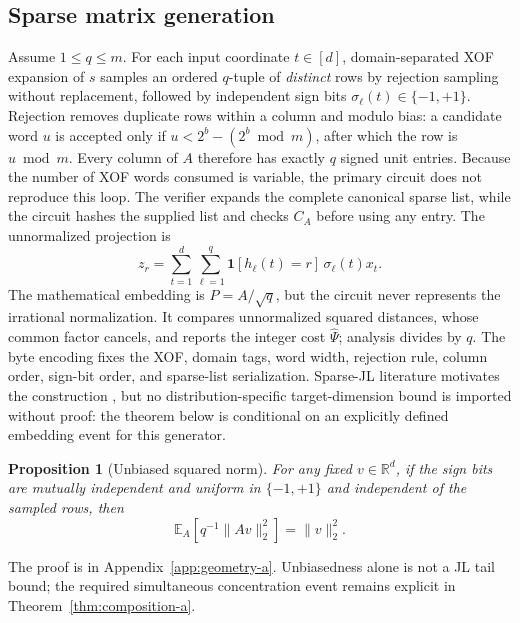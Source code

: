 \documentclass[pdflatex,sn-mathphys-num,iicol]{sn-jnl}
\newcommand{\tpexplain}[1]{}
\theoremstyle{plain}
\newtheorem{proposition}[theorem]{Proposition}
\theoremstyle{definition}
\theoremstyle{remark}
\begin{document}
\subsection{Sparse matrix generation}
\tpexplain{Define one exact distribution rather than saying “sparse JL.” State normalization and how it is represented without irrational constants.}
Assume $1\le q\le m$. For each input coordinate $t\in[d]$, domain-separated XOF expansion of $s$ samples an ordered $q$-tuple of \emph{distinct} rows by rejection sampling without replacement, followed by independent sign bits $\sigma_\ell(t)\in\{-1,+1\}$. Rejection removes duplicate rows within a column and modulo bias: a candidate word $u$ is accepted only if $u<2^b-(2^b\bmod m)$, after which the row is $u\bmod m$. Every column of $A$ therefore has exactly $q$ signed unit entries. Because the number of XOF words consumed is variable, the primary circuit does not reproduce this loop. The verifier expands the complete canonical sparse list, while the circuit hashes the supplied list and checks $C_A$ before using any entry. The unnormalized projection is
\begin{equation}
z_r=\sum_{t=1}^{d}\sum_{\ell=1}^{q}\mathbf{1}[h_\ell(t)=r]\,\sigma_\ell(t)x_t.
\end{equation}
The mathematical embedding is $P=A/\sqrt q$, but the circuit never represents the irrational normalization. It compares unnormalized squared distances, whose common factor cancels, and reports the integer cost $\widehat\Psi$; analysis divides by $q$. The byte encoding fixes the XOF, domain tags, word width, rejection rule, column order, sign-bit order, and sparse-list serialization. Sparse-JL literature motivates the construction \cite{kane2014sparser}, but no distribution-specific target-dimension bound is imported without proof: the theorem below is conditional on an explicitly defined embedding event for this generator.

\begin{proposition}[Unbiased squared norm]\label{prop:unbiased-a}
For any fixed $v\in\mathbb R^d$, if the sign bits are mutually independent and uniform in $\{-1,+1\}$ and independent of the sampled rows, then
\[
\mathbb E_A\!\left[q^{-1}\|Av\|_2^2\right]=\|v\|_2^2.
\]
\end{proposition}
The proof is in Appendix~\ref{app:geometry-a}. Unbiasedness alone is not a JL tail bound; the required simultaneous concentration event remains explicit in Theorem~\ref{thm:composition-a}.
\end{document}
